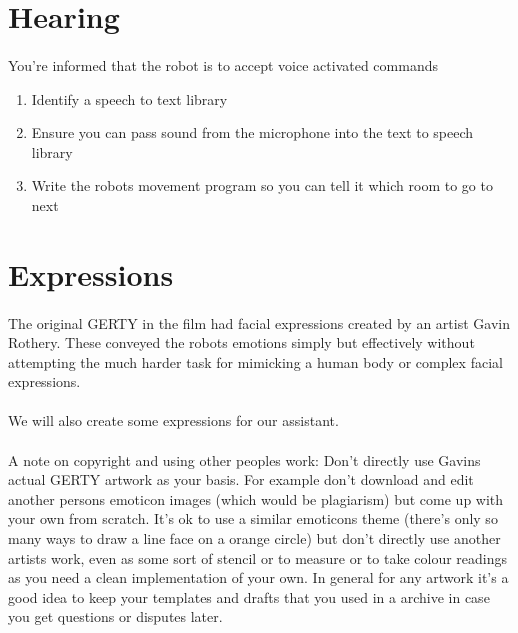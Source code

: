 \documentclass[11pt]{book}
\begin{document}
\clearpage

\section{Hearing}

\paragraph{} You're informed that the robot is to accept voice activated commands

\begin{enumerate}
\item Identify a speech to text library
\item Ensure you can pass sound from the microphone into the text to speech library
\item Write the robots movement program so you can tell it which room to go to next
\end{enumerate}

\clearpage


\section{Expressions}

\paragraph{} The original GERTY in the film had facial expressions created by an artist Gavin Rothery. These conveyed the robots emotions simply but effectively without attempting the much harder task for mimicking a human body or complex facial expressions.

\paragraph{} We will also create some expressions for our assistant.

\paragraph{} A note on copyright and using other peoples work: Don't directly use Gavins actual GERTY artwork as your basis. For example don't download and edit another persons emoticon images (which would be plagiarism) but come up with your own from scratch. It's ok to use a similar emoticons theme (there's only so many ways to draw a line face on a orange circle) but don't directly use another artists work, even as some sort of stencil or to measure or to take colour readings as you need a clean implementation of your own. In general for any artwork it's a good idea to keep your templates and drafts that you used in a archive in case you get questions or disputes later.
\end{document}
